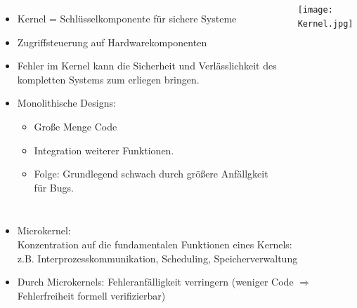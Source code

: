 \documentclass{beamer}
\begin{document}

\begin{frame}
\begin{columns}[c]
\begin{itemize}
\item Kernel = Schl\"usselkomponente f\"ur sichere Systeme
\item Zugriffsteuerung auf Hardwarekomponenten
\item Fehler im Kernel kann die Sicherheit und Verl\"asslichkeit des kompletten Systems zum erliegen bringen.
\item Monolithische Designs: 
\begin{itemize}
\item Große Menge Code
\item Integration weiterer Funktionen.
\item Folge: Grundlegend schwach durch größere Anfällgkeit für Bugs.
\end{itemize}
\end{itemize}
\texttt{[image: Kernel.jpg]}
\end{columns}
\begin{itemize}
\item Microkernel:\\
Konzentration auf die fundamentalen Funktionen eines Kernels: \\
z.B. Interprozesskommunikation, Scheduling, Speicherverwaltung
\item Durch Microkernels: Fehleranfälligkeit verringern (weniger Code $\Rightarrow$ Fehlerfreiheit formell verifizierbar)
\end{itemize}
\end{frame}

\end{document}
